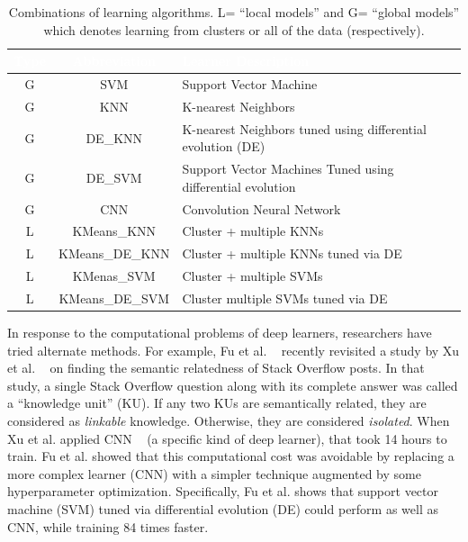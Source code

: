 \documentclass[sigconf]{acmart}
\theoremstyle{break}
\begin{document}
  
  \begin{table}[!b]
        \centering
        \small
        \begin{tabular}{c|c|p{4.5cm}}
            \rowcolor{gray} \textcolor{white}{\textbf{Type}} & \textcolor{white}{\textbf{Abbreviation}} & \textcolor{white}{\textbf{Learner Description}}\\
            \hline
            G & SVM & Support Vector Machine \\ 
            \rowcolor{lightgray} G & KNN & K-nearest Neighbors \\ 
            G & DE\_KNN & K-nearest Neighbors tuned using differential evolution (DE)\\ 
            \rowcolor{lightgray} G & DE\_SVM & Support Vector Machines Tuned using differential evolution \\
            G & CNN & Convolution Neural Network \\
            \rowcolor{lightgray}L & KMeans\_KNN & Cluster + multiple KNNs \\ 
            L & KMeans\_DE\_KNN & Cluster + multiple KNNs tuned via DE \\ 
            \rowcolor{lightgray}L & KMenas\_SVM & Cluster + multiple SVMs \\ 
            L & KMeans\_DE\_SVM & Cluster multiple SVMs tuned via DE \\ 
        \end{tabular}\vspace{3mm}
        \caption{Combinations of learning algorithms.
        L= ``local models''  and G= ``global models'' which denotes learning from clusters or all
        of the data (respectively).}
        \label{tab:learners}
    \end{table}
    
    
   In response to the computational problems of
   deep learners, researchers have tried alternate methods.
   For example,
   Fu et al. ~\cite{fu2017easy} recently revisited
   a study by Xu et al. ~\cite{xu2016predicting}   on finding the semantic relatedness of Stack Overflow posts.
   In that study, a single Stack Overflow question along with its complete answer was called a ``knowledge unit'' (KU). If any two KUs are semantically related, they are considered as {\em linkable} knowledge. Otherwise, they are considered {\em isolated}.   When Xu et al. applied CNN ~\cite{hubel1959receptive} (a specific kind of deep learner), that took 14 hours to train. Fu et al.
   showed
   that this computational cost was avoidable
   by replacing a more complex learner (CNN)
   with a simpler technique augmented by some
   hyperparameter optimization.
   Specifically, Fu et al. shows that   support vector machine (SVM) tuned via differential evolution (DE) could  perform as well as CNN, while
   training   84 times  faster.  
    
\end{document}
